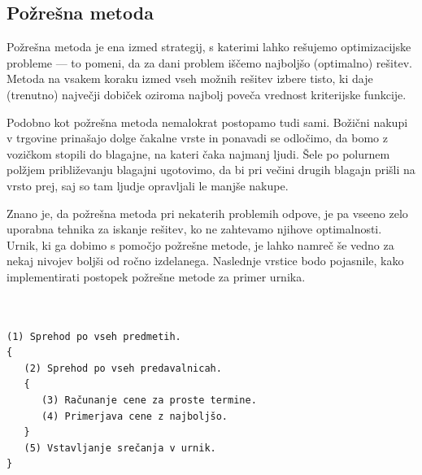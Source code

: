 \documentclass[a4paper, 10pt]{article}
\begin{document}
\subsection{Požrešna metoda }

Požrešna metoda je ena izmed strategij, s katerimi lahko rešujemo optimizacijske probleme \---- 
to pomeni, da za dani problem iščemo najboljšo (optimalno) rešitev. Metoda na vsakem koraku
izmed vseh možnih rešitev izbere  tisto, ki daje (trenutno) največji dobiček oziroma najbolj
poveča vrednost kriterijske funkcije.

Podobno kot požrešna metoda nemalokrat postopamo tudi sami. Božični nakupi v trgovine
prinašajo dolge čakalne vrste in ponavadi se odločimo, da bomo z vozičkom stopili do blagajne,
na kateri čaka najmanj ljudi. Šele po polurnem polžjem približevanju blagajni ugotovimo,
da bi pri večini drugih blagajn prišli na vrsto prej, saj so tam ljudje opravljali le
manjše nakupe.

Znano je, da požrešna metoda pri nekaterih problemih odpove, je pa vseeno zelo uporabna
tehnika za iskanje rešitev, ko ne zahtevamo njihove optimalnosti. Urnik, ki ga dobimo s
pomočjo požrešne metode, je lahko namreč še vedno za nekaj nivojev boljši od ročno izdelanega.
Naslednje vrstice bodo pojasnile, kako implementirati postopek požrešne metode za primer urnika.

\begin{verbatim}
   

(1) Sprehod po vseh predmetih.
{
   (2) Sprehod po vseh predavalnicah.
   {
      (3) Računanje cene za proste termine.
      (4) Primerjava cene z najboljšo.
   }
   (5) Vstavljanje srečanja v urnik.
}
\end{verbatim}
\end{document}
